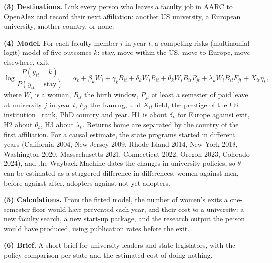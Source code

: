 \documentclass[10pt,twocolumn]{article}
\begin{document}
\textbf{(3) Destinations.} Link every person who leaves a faculty job in AARC to OpenAlex and record their next affiliation: another US university, a European university, another country, or none.

\textbf{(4) Model.} For each faculty member $i$ in year $t$, a competing-risks (multinomial logit) model of five outcomes $k$: stay, move within the US, move to Europe, move elsewhere, exit,
\[ \log \frac{P(y_{it}=k)}{P(y_{it}=\text{stay})} = \alpha_k + \beta_k W_i + \gamma_k B_{it} + \delta_k W_i B_{it} + \theta_k W_i B_{it} P_{jt} + \lambda_k W_i B_{it} F_{jt} + X_{it}\eta_k , \]
where $W_i$ is a woman, $B_{it}$ the birth window, $P_{jt}$ at least a semester of paid leave at university $j$ in year $t$, $F_{jt}$ the framing, and $X_{it}$ field, the prestige of the US institution \citep{wapman2022}, rank, PhD country and year. H1 is about $\delta_k$ for Europe against exit, H2 about $\theta_k$, H3 about $\lambda_k$. Returns home are separated by the country of the first affiliation. For a causal estimate, the state programs started in different years (California 2004, New Jersey 2009, Rhode Island 2014, New York 2018, Washington 2020, Massachusetts 2021, Connecticut 2022, Oregon 2023, Colorado 2024), and the Wayback Machine dates the changes in university policies, so $\theta$ can be estimated as a staggered difference-in-differences, women against men, before against after, adopters against not yet adopters.

\textbf{(5) Calculations.} From the fitted model, the number of women's exits a one-semester floor would have prevented each year, and their cost to a university: a new faculty search, a new start-up package, and the research output the person would have produced, using publication rates before the exit.

\textbf{(6) Brief.} A short brief for university leaders and state legislators, with the policy comparison per state and the estimated cost of doing nothing.
\end{document}
